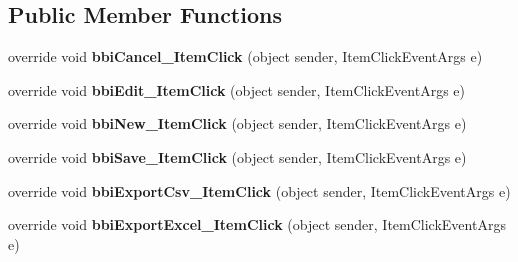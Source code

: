 \subsection*{Public Member Functions}
\begin{DoxyCompactItemize}
\item 
\mbox{\label{class_h_k_supply_1_1_forms_1_1_master_1_1_bom_breakdown_management_a2af0c446dc41887a28f0b1d0554041e0}} 
override void {\bfseries bbi\+Cancel\+\_\+\+Item\+Click} (object sender, Item\+Click\+Event\+Args e)
\item 
\mbox{\label{class_h_k_supply_1_1_forms_1_1_master_1_1_bom_breakdown_management_a8d25e7ac514f27e41fa9e0e3277d72d4}} 
override void {\bfseries bbi\+Edit\+\_\+\+Item\+Click} (object sender, Item\+Click\+Event\+Args e)
\item 
\mbox{\label{class_h_k_supply_1_1_forms_1_1_master_1_1_bom_breakdown_management_a5d136cef37f3fe72306bff1a2e32fbad}} 
override void {\bfseries bbi\+New\+\_\+\+Item\+Click} (object sender, Item\+Click\+Event\+Args e)
\item 
\mbox{\label{class_h_k_supply_1_1_forms_1_1_master_1_1_bom_breakdown_management_a116b1f85bb67a59a2ed275eb568a4a56}} 
override void {\bfseries bbi\+Save\+\_\+\+Item\+Click} (object sender, Item\+Click\+Event\+Args e)
\item 
\mbox{\label{class_h_k_supply_1_1_forms_1_1_master_1_1_bom_breakdown_management_af33085a47f35f09c57ef0e16728e43ed}} 
override void {\bfseries bbi\+Export\+Csv\+\_\+\+Item\+Click} (object sender, Item\+Click\+Event\+Args e)
\item 
\mbox{\label{class_h_k_supply_1_1_forms_1_1_master_1_1_bom_breakdown_management_a7276b2b885d3de6327978855b8bb9266}} 
override void {\bfseries bbi\+Export\+Excel\+\_\+\+Item\+Click} (object sender, Item\+Click\+Event\+Args e)
\end{DoxyCompactItemize}

